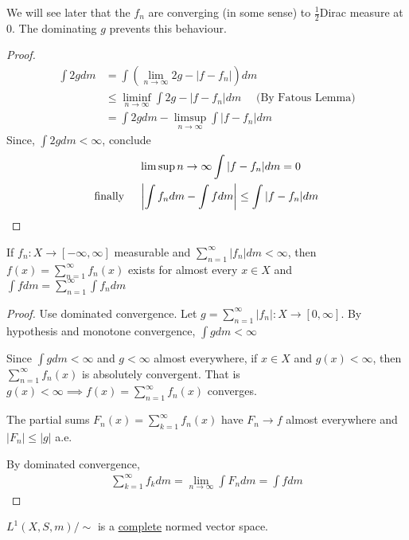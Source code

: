 We will see later that the $f_{n}$ are converging (in some sense) to $\frac{1}{2}$Dirac measure at $0$. The dominating $g$ prevents this behaviour.

\begin{proof}
	\begin{align*}
		\int 2g dm &= \int \left( \lim_{n \to \infty} 2g - | f - f_{n}| \right) dm \\
				   &\leq \liminf_{n \to \infty} \int 2g - |f - f_{n}|dm \quad \text{ (By Fatous Lemma)} \\
				   &= \int 2g dm - \limsup_{n \to \infty} \int | f - f_{n}| dm
	\end{align*} 
	Since, $\int 2gdm < \infty$, conclude 
	\begin{align*}
		&\limsup{n \to \infty} \int |f - f_n | dm = 0 \\ \text{finally \quad}
		& \left| \int f_n dm - \int f dm \right| \leq \int | f - f_n | dm
	\end{align*} 
\end{proof}

\begin{corollary}
	If $f_{n} : X \to [-\infty, \infty]$ measurable and $\sum_{n=1}^{\infty} | f_n | dm < \infty$,
	then $f(x) = \sum_{n=1}^{\infty}f_n (x)$ exists for almost every $x \in X$ and $\int f dm = \sum_{n=1}^{\infty} \int f_{n}dm$
\end{corollary}

\begin{proof}
	Use dominated convergence. Let $g = \sum_{n=1}^{\infty} | f_n | : X \to [0,\infty]$.
	By hypothesis and monotone convergence, $\int gdm < \infty$

	Since $\int g dm < \infty$ and $g < \infty$ almost everywhere, if $x \in X$ and $g(x) < \infty$,
	then $\sum_{n=1}^{\infty} f_{n} (x)$ is absolutely convergent. That is $g(x) < \infty \implies f(x) = \sum_{n=1}^{\infty} f_{n}(x)$ converges.

	The partial sums $F_n (x) = \sum_{k=1}^{\infty} f_{n}(x)$ have $F_n \to f$ almost everywhere and $|F_{n}| \leq |g|$ a.e.

	By dominated convergence,
	\begin{align*}
	\sum_{k=1}^{\infty}f_{k} dm = \lim_{n \to \infty} \int F_n dm = \int f dm
	\end{align*} 
\end{proof}


\begin{corollary}
	$L^{1}(X,S, m) / \sim$ is a \underline{complete} normed vector space.
\end{corollary}


